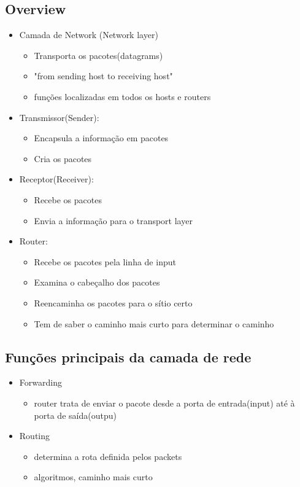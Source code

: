 \documentclass[../resumosRCOM.tex]{subfiles}
\begin{document}
\subsection{Overview}
\begin{itemize}
    \item Camada de Network (Network layer)
    \begin{itemize}
        \item Transporta os pacotes(datagrams)
        \item "from sending host to receiving host"
        \item funções localizadas em todos os hosts e routers
    \end{itemize}
    \item Transmissor(Sender):
    \begin{itemize}
        \item Encapsula a informação em pacotes
        \item Cria os pacotes
    \end{itemize}
    \item Receptor(Receiver):
    \begin{itemize}
        \item Recebe os pacotes
	    \item Envia a informação para o transport layer
    \end{itemize}
    \item Router:
    \begin{itemize}
        \item Recebe os pacotes pela linha de input
        \item Examina o cabeçalho dos pacotes
	    \item Reencaminha os pacotes para o sítio certo
	    \item Tem de saber o caminho mais curto para determinar o caminho
    \end{itemize}
\end{itemize}

\subsection{Funções principais da camada de rede}

\begin{itemize}
    \item Forwarding
    \begin{itemize}
        \item router trata de enviar o pacote desde a porta de entrada(input) até à porta de saída(outpu)
    \end{itemize}
    \item Routing
    \begin{itemize}
        \item determina a rota definida pelos packets
        \item algoritmos, caminho mais curto
    \end{itemize}
\end{itemize}
\end{document}
